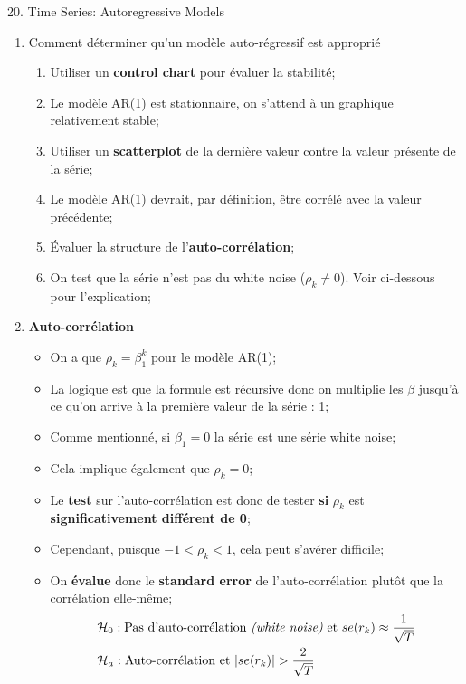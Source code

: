 \documentclass[12pt, titlepage, french]{report}
\begin{document}
\begin{CHPT_SUMM}[label = {timeseries20}]{20. Time Series: Autoregressive Models}
\begin{enumerate}
\begin{itemize}
		\item[]	Ce faisant, le domaine de $\beta_{1}$ implique que le modèle auto-régressif sera stationnaire sans être une série white noise;
		\end{itemize}
	\item[]	Comment déterminer qu'un modèle auto-régressif est approprié
		\begin{enumerate}
		\item	Utiliser un \textbf{control chart} pour évaluer la stabilité;
		\item[]	Le modèle AR(1) est stationnaire, on s'attend à un graphique relativement stable;
		\item	Utiliser un \textbf{scatterplot} de la dernière valeur contre la valeur présente de la série;
		\item[]	Le modèle AR(1) devrait, par définition, être corrélé avec la valeur précédente;
		\item	Évaluer la structure de l'\textbf{auto-corrélation};
		\item[]	On test que la série n'est pas du white noise ($\rho_{k} \neq 0$). Voir ci-dessous pour l'explication;
		\end{enumerate}
	\item[]	\textbf{Auto-corrélation}
		\begin{itemize}
		\item	On a que $\rho_{k} = \beta^{k}_{1}$ pour le modèle AR(1);
		\item[]	La logique est que la formule est récursive donc on multiplie les $\beta$ jusqu'à ce qu'on arrive à la première valeur de la série : 1;
		\item	Comme mentionné, si $\beta_{1} = 0$ la série est une série white noise;
		\item[]	Cela implique également que $\rho_{k} = 0$;
		\item	Le \textbf{test} sur l'auto-corrélation est donc de tester \textbf{si} $\rho_{k}$ est \textbf{significativement différent de 0};
		\item[]	Cependant, puisque $-1 < \rho_{k} < 1$, cela peut s'avérer difficile;
		\item[] On \textbf{évalue} donc le \textbf{standard error} de l'auto-corrélation plutôt que la corrélation elle-même;
		\setlength{\mathindent}{-1cm}
		\begin{align*}
			&\mathcal{H}_{0}: \text{Pas d'auto-corrélation \textit{(white noise)} et } se(r_{k}) \approx \frac{1}{\sqrt{T}}	\\
			&\mathcal{H}_{a}: \text{Auto-corrélation et } | se(r_{k}) | > \frac{2}{\sqrt{T}}	

\end{align*}
\end{itemize}
\end{enumerate}
\end{CHPT_SUMM}
\end{document}

